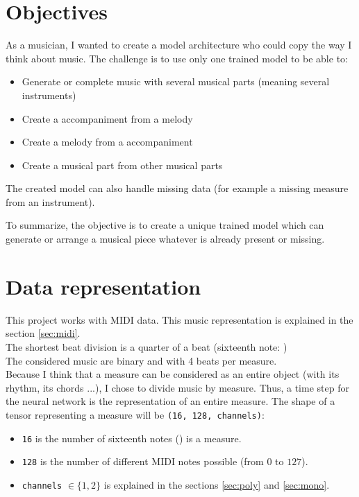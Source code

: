 \documentclass[12pt]{report}
\begin{document}
\section{Objectives}
\label{sec:objectives}

As a musician, I wanted to create a model architecture who could copy the way I think about music.
The challenge is to use only one trained model to be able to:
\begin{itemize}
    \item Generate or complete music with several musical parts (meaning several instruments)
    \item Create a accompaniment from a melody
    \item Create a melody from a accompaniment
    \item Create a musical part from other musical parts
\end{itemize}
The created model can also handle missing data (for example a missing measure from an instrument).

To summarize, the objective is to create a unique trained model which can generate or arrange a musical piece whatever is already present or missing.

\section{Data representation}
\label{sec:data_represetation}

This project works with MIDI data. This music representation is explained in the section \ref{sec:midi}. \\
The shortest beat division is a quarter of a beat (sixteenth note: \musSixteenth) \\
The considered music are binary and with 4 beats per measure. \\
Because I think that a measure can be considered as an entire object (with its rhythm, its chords ...), I chose to divide music by measure. Thus, a time step for the neural network is the representation of an entire measure.
The shape of a tensor representing a measure will be \texttt{(16, 128, channels)}:
\begin{itemize}
    \item \texttt{16} is the number of sixteenth notes (\musSixteenth) is a measure.
    \item \texttt{128} is the number of different MIDI notes possible (from $0$ to $127$).
    \item \texttt{channels} $\in \{1, 2\}$ is explained in the sections \ref{sec:poly} and \ref{sec:mono}.
\end{itemize}
\end{document}
